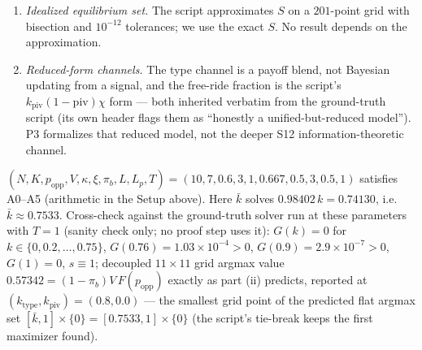 \begin{remark}
\begin{enumerate}
\emph{is} a stage equilibrium and relies on the max selection to conclude it is played. Under
a pessimistic selection ($\min S$) the interior would die at $T=1$ ($D(0)<0$ always, so
$0\in S$ always); the inverted-U is a property of the momentum-selected dynamics, exactly as
v9 frames it.
\item \emph{Idealized equilibrium set.} The script approximates $S$ on a $201$-point grid with
bisection and $10^{-12}$ tolerances; we use the exact $S$. No result depends on the
approximation.
\item \emph{Reduced-form channels.} The type channel is a payoff blend, not Bayesian updating
from a signal, and the free-ride fraction is the script's
$k_{\mathrm{piv}}(1-\mathrm{piv})\chi$ form --- both inherited verbatim from the ground-truth
script (its own header flags them as ``honestly a unified-but-reduced model''). P3 formalizes
that reduced model, not the deeper S12 information-theoretic channel.
\end{enumerate}
\end{remark}

\begin{remark}\label{rem:instance}
$(N,K,p_{\mathrm{opp}},V,\kappa,\xi,\pi_b,L,L_p,T)=(10,7,0.6,3,1,0.667,0.5,3,0.5,1)$ satisfies
A0--A5 (arithmetic in the Setup above). Here $\bar k$ solves $0.98402\,k=0.74130$, i.e.\
$\bar k\approx 0.7533$. Cross-check against the ground-truth solver run at these parameters
with $T=1$ (sanity check only; no proof step uses it): $G(k)=0$ for $k\in\{0,0.2,\dots,0.75\}$,
$G(0.76)=1.03\times10^{-4}>0$, $G(0.9)=2.9\times10^{-7}>0$, $G(1)=0$, $s\equiv 1$; decoupled
$11\times 11$ grid argmax value $0.57342=(1-\pi_b)V\,F(p_{\mathrm{opp}})$ exactly as
part (ii) predicts, reported at $(k_{\mathrm{type}},k_{\mathrm{piv}})=(0.8,0.0)$ --- the
smallest grid point of the predicted flat argmax set
$[\bar k,1]\times\{0\}=[0.7533,1]\times\{0\}$ (the script's tie-break keeps the first
maximizer found).
\end{remark}

